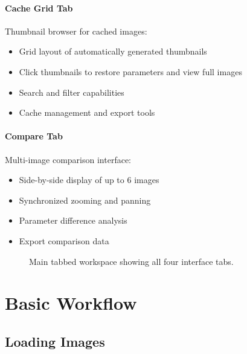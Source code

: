 \documentclass[11pt,a4paper]{article}
\begin{document}
\paragraph{Cache Grid Tab}
Thumbnail browser for cached images:
\begin{itemize}[leftmargin=*]
\item Grid layout of automatically generated thumbnails
\item Click thumbnails to restore parameters and view full images
\item Search and filter capabilities
\item Cache management and export tools
\end{itemize}

\paragraph{Compare Tab}
Multi-image comparison interface:
\begin{itemize}[leftmargin=*]
\item Side-by-side display of up to 6 images
\item Synchronized zooming and panning
\item Parameter difference analysis
\item Export comparison data
\end{itemize}

\begin{figure}[H]
\centering
\caption{Main tabbed workspace showing all four interface tabs.}
\label{fig:tabs-interface}
\end{figure}

\section{Basic Workflow}

\subsection{Loading Images}
\end{document}
